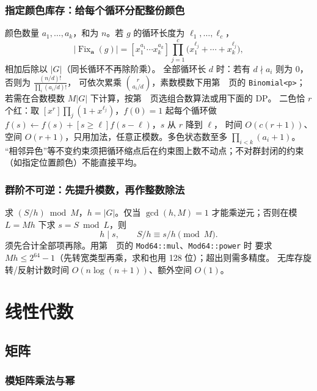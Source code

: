 \subsection{指定颜色库存：给每个循环分配整份颜色}\label{knowledge-orbits-inventory}
颜色数量 $a_1,\ldots,a_k$，和为 $n$。若 $g$ 的循环长度为 $\ell_1,\ldots,\ell_c$，
\[
|\operatorname{Fix}_{\boldsymbol a}(g)|=
[x_1^{a_1}\cdots x_k^{a_k}]
\prod_{j=1}^{c}\bigl(x_1^{\ell_j}+\cdots+x_k^{\ell_j}\bigr),
\]
相加后除以 $|G|$（同长循环不再除阶乘）。
全部循环长 $d$ 时：若有 $d\nmid a_i$ 则为 0，否则为 $\frac{(n/d)!}{\prod_i(a_i/d)!}$，
可依次累乘 $\binom{r}{a_i/d}$，素数模数下用第~\pageref{compact-Binomial}~页的 \texttt{Binomial<p>}；
若需在合数模数 $M|G|$ 下计算，按第~\pageref{knowledge-binomial-choice}~页选组合数算法或用下面的 DP。
二色恰 $r$ 个红：取 $[x^r]\prod_j(1+x^{\ell_j})$，$f(0)=1$ 起每个循环做 $f(s)\gets f(s)+[s\ge\ell]f(s-\ell)$，$s$ 从 $r$ 降到 $\ell$，
时间 $O(c(r+1))$、空间 $O(r+1)$，只用加法，任意正模数。多色状态数至多 $\prod_{i<k}(a_i+1)$。
“相邻异色”等不变约束须把循环缩点后在约束图上数不动点；不对群封闭的约束（如指定位置颜色）不能直接平均。



\subsection{群阶不可逆：先提升模数，再作整数除法}\label{knowledge-orbits-modular}
求 $(S/h)\bmod M$，$h=|G|$。仅当 $\gcd(h,M)=1$ 才能乘逆元；否则在模 $L=Mh$ 下求 $s=S\bmod L$，则
\[
h\mid s,\qquad S/h\equiv s/h\pmod M.
\]
须先合计全部项再除。用第~\pageref{compact-Mod64}~页的 \texttt{Mod64::mul}、\texttt{Mod64::power} 时
要求 $Mh\le2^{64}-1$（先转宽类型再乘，求和也用 128 位）；超出则需多精度。
无库存旋转/反射计数时间 $O(n\log(n+1))$、额外空间 $O(1)$。
\label{end-orbits-supplement}


\Needspace{540pt}

\chapter{线性代数}

\section{矩阵}

\subsection{模矩阵乘法与幂}\label{compact-ModMatrix}

